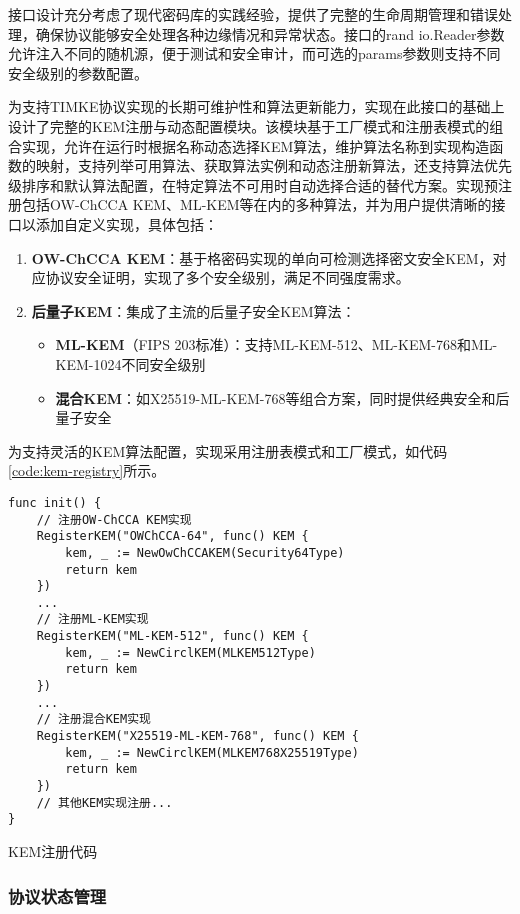 接口设计充分考虑了现代密码库的实践经验，提供了完整的生命周期管理和错误处理，确保协议能够安全处理各种边缘情况和异常状态。接口的rand io.Reader参数允许注入不同的随机源，便于测试和安全审计，而可选的params参数则支持不同安全级别的参数配置。

为支持TIMKE协议实现的长期可维护性和算法更新能力，实现在此接口的基础上设计了完整的KEM注册与动态配置模块。该模块基于工厂模式和注册表模式的组合实现，允许在运行时根据名称动态选择KEM算法，维护算法名称到实现构造函数的映射，支持列举可用算法、获取算法实例和动态注册新算法，还支持算法优先级排序和默认算法配置，在特定算法不可用时自动选择合适的替代方案。实现预注册包括OW-ChCCA KEM、ML-KEM等在内的多种算法，并为用户提供清晰的接口以添加自定义实现，具体包括：

\begin{enumerate}
    \item \textbf{OW-ChCCA KEM}：基于格密码实现的单向可检测选择密文安全KEM，对应协议安全证明，实现了多个安全级别，满足不同强度需求。
    
    \item \textbf{后量子KEM}：集成了主流的后量子安全KEM算法：
    \begin{itemize}
        \item \textbf{ML-KEM}（FIPS 203标准）：支持ML-KEM-512、ML-KEM-768和ML-KEM-1024不同安全级别
        \item \textbf{混合KEM}：如X25519-ML-KEM-768等组合方案，同时提供经典安全和后量子安全
    \end{itemize}
\end{enumerate}

为支持灵活的KEM算法配置，实现采用注册表模式和工厂模式，如代码\ref{code:kem-registry}所示。

\begin{listing}[ht]
\begin{verbatim}
func init() {
    // 注册OW-ChCCA KEM实现
    RegisterKEM("OWChCCA-64", func() KEM {
        kem, _ := NewOwChCCAKEM(Security64Type)
        return kem
    })
    ...
    // 注册ML-KEM实现
    RegisterKEM("ML-KEM-512", func() KEM {
        kem, _ := NewCirclKEM(MLKEM512Type)
        return kem
    })
    ...
    // 注册混合KEM实现
    RegisterKEM("X25519-ML-KEM-768", func() KEM {
        kem, _ := NewCirclKEM(MLKEM768X25519Type)
        return kem
    })
    // 其他KEM实现注册...
}
\end{verbatim}
\caption{KEM注册代码}
\label{code:kem-registry}
\end{listing}

\subsubsection{协议状态管理}
\label{subsubsec:state_management}

